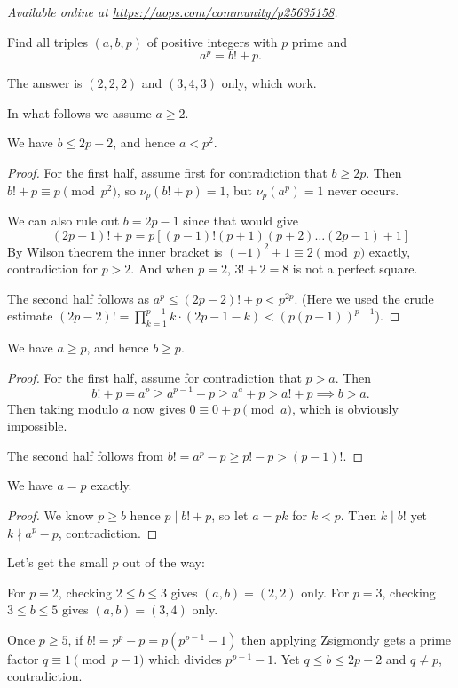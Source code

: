 \textsl{Available online at \url{https://aops.com/community/p25635158}.}
\begin{mdframed}[style=mdpurplebox,frametitle={Problem statement}]
Find all triples $(a,b,p)$ of positive integers with $p$ prime and
\[ a^p=b!+p. \]
\end{mdframed}
The answer is $(2,2,2)$ and $(3,4,3)$ only, which work.

In what follows we assume $a \ge 2$.

\begin{claim*}
  We have $b \le 2p-2$, and hence $a < p^2$.
\end{claim*}
\begin{proof}
  For the first half, assume first for contradiction that $b \ge 2p$.
  Then $b!+p \equiv p \pmod{p^2}$, so $\nu_p(b!+p)=1$,
  but $\nu_p(a^p)=1$ never occurs.

  We can also rule out $b = 2p-1$ since that would give
  \[ (2p-1)!+p = p \left[ (p-1)! (p+1)(p+2)\dots(2p-1) + 1 \right] \]
  By Wilson theorem the inner bracket is $(-1)^2+1 \equiv 2 \pmod p$
  exactly, contradiction for $p > 2$.
  And when $p=2$, $3!+2=8$ is not a perfect square.

  The second half follows as $a^p \le (2p-2)!+p < p^{2p}$.
  (Here we used the crude estimate
  $(2p-2)! = \prod_{k=1}^{p-1}k \cdot (2p-1-k) < (p(p-1))^{p-1}$).
\end{proof}

\begin{claim*}
  We have $a \ge p$, and hence $b \ge p$.
\end{claim*}
\begin{proof}
  For the first half, assume for contradiction that $p > a$.
  Then
  \[ b! + p = a^p \ge a^{p-1} + p \ge a^a + p > a! + p \implies b > a. \]
  Then taking modulo $a$ now gives $0 \equiv 0 + p \pmod{a}$,
  which is obviously impossible.

  The second half follows from $b! = a^p-p \ge p! - p > (p-1)!$.
\end{proof}

\begin{claim*}
  We have $a=p$ exactly.
\end{claim*}
\begin{proof}
  We know $p \ge b$ hence $p \mid b!+p$, so let $a = pk$ for $k < p$.
  Then $k \mid b!$ yet $k \nmid a^p-p$, contradiction.
\end{proof}

Let's get the small $p$ out of the way:
\begin{itemize}
  \ii For $p=2$, checking $2 \le b \le 3$ gives $(a,b)=(2,2)$ only.
  \ii For $p=3$, checking $3 \le b \le 5$ gives $(a,b)=(3,4)$ only.
\end{itemize}
Once $p \ge 5$, if $b! = p^p - p = p(p^{p-1}-1)$
then applying Zsigmondy gets a prime factor $q \equiv 1 \pmod{p-1}$
which divides $p^{p-1}-1$.
Yet $q \le b \le 2p-2$ and $q \neq p$, contradiction.
\pagebreak